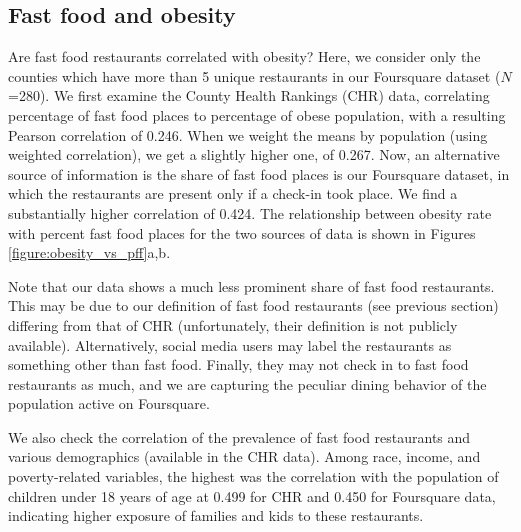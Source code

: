 \documentclass{sig-alternate-2013}
\begin{document}
\subsection{Fast food and obesity}

\begin{figure*}[t!]
\hfill
{}\hfill
{}\hfill
\caption{County-wide percentage of fast food places as measured by CHR (a) or Foursquare (b), and number of chain restaurants (c) to percentage of obesity}
\label{figure:obesity_vs_pff}
\end{figure*}

Are fast food restaurants correlated with obesity? Here, we consider only the counties which have more than 5 unique restaurants in our Foursquare dataset ($N$=280). We first examine the County Health Rankings (CHR) data, correlating percentage of fast food places to percentage of obese population, with a resulting Pearson correlation of 0.246. When we weight the means by population (using weighted correlation), we get a slightly higher one, of 0.267. Now, an alternative source of information is the share of fast food places is our Foursquare dataset, in which the restaurants are present only if a check-in took place. We find a substantially higher correlation of 0.424. The relationship between obesity rate with percent fast food places for the two sources of data is shown in Figures \ref{figure:obesity_vs_pff}a,b. 

Note that our data shows a much less prominent share of fast food restaurants. This may be due to our definition of fast food restaurants (see previous section) differing from that of CHR (unfortunately, their definition is not publicly available). Alternatively, social media users may label the restaurants as something other than fast food. Finally, they may not check in to fast food restaurants as much, and we are capturing the peculiar dining behavior of the population active on Foursquare. 

We also check the correlation of the prevalence of fast food restaurants and various demographics (available in the CHR data). Among race, income, and poverty-related variables, the highest was the correlation with the population of children under 18 years of age at 0.499 for CHR and 0.450 for Foursquare data, indicating higher exposure of families and kids to these restaurants. 
\end{document}

